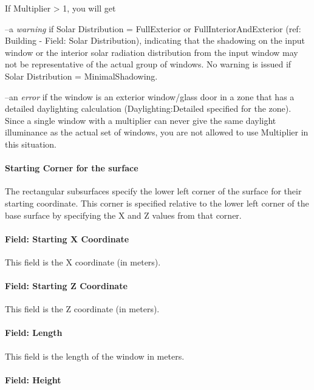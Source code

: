 If Multiplier \textgreater{} 1, you will get

--a \emph{warning} if Solar Distribution = FullExterior or FullInteriorAndExterior (ref: Building - Field: Solar Distribution), indicating that the shadowing on the input window or the interior solar radiation distribution from the input window may not be representative of the actual group of windows. No warning is issued if Solar Distribution = MinimalShadowing.

--an \emph{error} if the window is an exterior window/glass door in a zone that has a detailed daylighting calculation (Daylighting:Detailed specified for the zone). Since a single window with a multiplier can never give the same daylight illuminance as the actual set of windows, you are not allowed to use Multiplier in this situation.

\paragraph{Starting Corner for the surface}\label{starting-corner-for-the-surface-10}

The rectangular subsurfaces specify the lower left corner of the surface for their starting coordinate. This corner is specified relative to the lower left corner of the base surface by specifying the X and Z values from that corner.

\paragraph{Field: Starting X Coordinate}\label{field-starting-x-coordinate-10}

This field is the X coordinate (in meters).

\paragraph{Field: Starting Z Coordinate}\label{field-starting-z-coordinate-10}

This field is the Z coordinate (in meters).

\paragraph{Field: Length}\label{field-length-10}

This field is the length of the window in meters.

\paragraph{Field: Height}\label{field-height-4}

